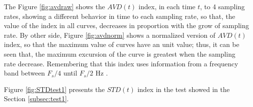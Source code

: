 \documentclass[review]{elsarticle}
\begin{document}
The Figure \ref{fig:avdraw} shows the $AVD(t)$ index, in each time $t$, 
to 4 sampling rates, showing a different behavior in time to each sampling rate,
so that, the value of the index in all  curves, decreases in proportion with 
the grow of sampling rate. By other side,
Figure \ref{fig:avdnorm} shows a normalized version of $AVD(t)$ index, 
so that the maximum value of curves have an unit value; thus,
it can be seen that, the maximum excursion of the curve is greatest when 
the sampling rate decrease. Remembering that this index uses information from a frequency
band between $F_s/4$ until $F_s/2$ Hz \cite{rivera2017selection}.

Figure \ref{fig:STDtest1} presents the $STD(t)$ index in the test showed in the 
Section \ref{subsec:test1}.
\end{document}
